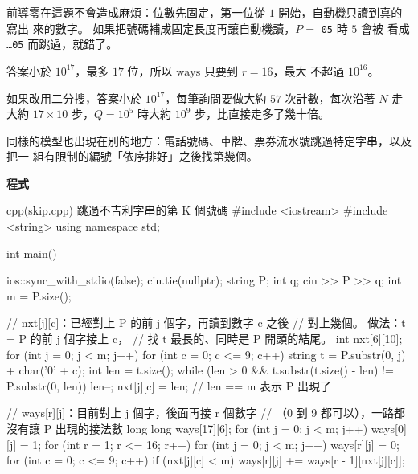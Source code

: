 前導零在這題不會造成麻煩：位數先固定，第一位從 $1$ 開始，自動機只讀到真的寫出
來的數字。 如果把號碼補成固定長度再讓自動機讀，$P =$ \texttt{05} 時 $5$ 會被
看成 \texttt{\ldots 05} 而跳過，就錯了。

答案小於 $10^{17}$，最多 $17$ 位，所以 $\mathrm{ways}$ 只要到 $r = 16$，最大
不超過 $10^{16}$。

如果改用二分搜，答案小於 $10^{17}$，每筆詢問要做大約 $57$ 次計數，每次沿著 $N$
走大約 $17 \times 10$ 步，$Q = 10^5$ 時大約 $10^9$ 步，比直接走多了幾十倍。

同樣的模型也出現在別的地方：電話號碼、車牌、票券流水號跳過特定字串，以及把一
組有限制的編號「依序排好」之後找第幾個。

\textbf{程式}

\begin{example}[label=ex:dg-skip]{cpp}{(skip.cpp) 跳過不吉利字串的第 K 個號碼}
#include <iostream>
#include <string>
using namespace std;

int main() {
    ios::sync_with_stdio(false);
    cin.tie(nullptr);
    string P;
    int q;
    cin >> P >> q;
    int m = P.size();

    // nxt[j][c]：已經對上 P 的前 j 個字，再讀到數字 c 之後
    // 對上幾個。 做法：t = P 的前 j 個字接上 c，
    // 找 t 最長的、同時是 P 開頭的結尾。
    int nxt[6][10];
    for (int j = 0; j < m; j++) {
        for (int c = 0; c <= 9; c++) {
            string t = P.substr(0, j) + char('0' + c);
            int len = t.size();
            while (len > 0 &&
                   t.substr(t.size() - len) != P.substr(0, len)) {
                len--;
            }
            nxt[j][c] = len;           // len == m 表示 P 出現了
        }
    }

    // ways[r][j]：目前對上 j 個字，後面再接 r 個數字
    // （0 到 9 都可以），一路都沒有讓 P 出現的接法數
    long long ways[17][6];
    for (int j = 0; j < m; j++) {
        ways[0][j] = 1;
    }
    for (int r = 1; r <= 16; r++) {
        for (int j = 0; j < m; j++) {
            ways[r][j] = 0;
            for (int c = 0; c <= 9; c++) {
                if (nxt[j][c] < m) {
                    ways[r][j] += ways[r - 1][nxt[j][c]];
                }
            }
        }
    }

}
\end{example}
